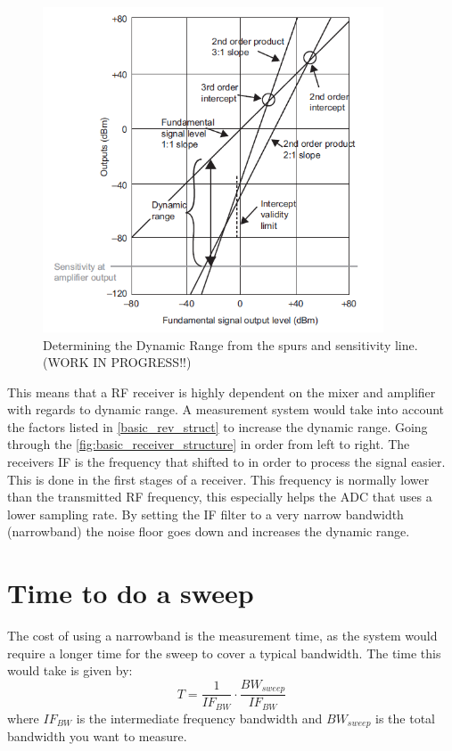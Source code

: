 \begin{figure}[H]
\centering
\includegraphics[width=0.90\textwidth]{figures/Dynamic_range_calc.png}
\caption{Determining the Dynamic Range from the spurs and sensitivity line.(WORK IN PROGRESS!!)}
\label{Dynamic_range_calc}
\end{figure}
 
This means that a RF receiver is highly dependent on the mixer and amplifier with regards to dynamic range. A measurement system would take into account the factors listed in \autoref{basic_rev_struct} to increase the dynamic range. Going through the \autoref{fig:basic_receiver_structure} in order from left to right. The receivers \gls{IF} is the frequency that shifted to in order to process the signal easier.  This is done in the first stages of a receiver. This frequency is normally lower than the transmitted RF frequency, this especially helps the \gls{ADC} that uses a lower sampling rate. 
By setting the \gls{IF} filter to a very narrow bandwidth (narrowband) the noise floor goes down and increases the dynamic range. 

\section{Time to do a sweep}
The cost of using a narrowband is the measurement time, as the system would require a longer time for the sweep to cover a typical bandwidth. The time this would take is given by:
\begin{equation}
T = \frac{1}{IF_{BW}} \cdot \frac{BW_{sweep}}{IF_{BW}}
\end{equation}
where $IF_{BW}$ is the intermediate frequency bandwidth and $BW_{sweep}$ is the total bandwidth you want to measure.


